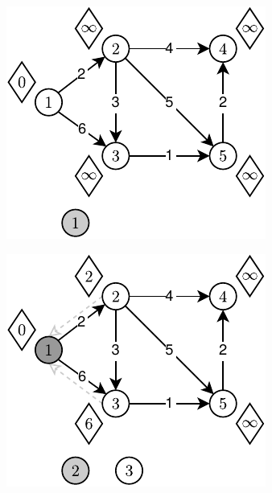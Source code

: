 \begin{figure}[!htbp]
	\centering
	\begin{subfigure}[b]{0.28\textwidth}
		\includegraphics[width=\textwidth]{Chapter_III/GRAPH-GROWTH-2Q-Example/a.pdf}
		\caption{}
	\end{subfigure}
	\quad
	\begin{subfigure}[b]{0.28\textwidth}
		\includegraphics[width=\textwidth]{Chapter_III/GRAPH-GROWTH-2Q-Example/b.pdf}

\end{subfigure}
\end{figure}
